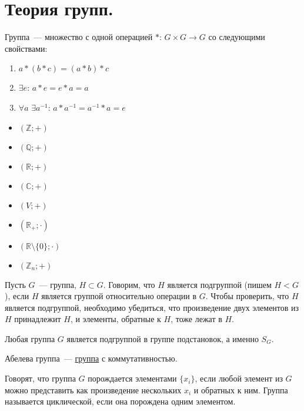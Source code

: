 \documentclass{article}
\begin{document}
	\tableofcontents
	\setcounter{tocdepth}{3}
	\newpage
	\section{Теория групп.}
	\begin{definition}
		\label{group-def}
		Группа~--- множество с одной операцией $*$: $G \times G \rightarrow G$ со следующими свойствами:
		\begin{enumerate}
			\item $a * (b * c) = (a * b) * c$
			\item $\exists e$: $a * e = e * a = a$
			\item $\forall a$ $\exists a^{-1}$: $a * a^{-1} = a^{-1} * a = e$
		\end{enumerate}
	\end{definition}
	\begin{example}
		\begin{itemize}
			\item $(\mathbb{Z}; +)$
			\item $(\mathbb{Q}; +)$
			\item $(\mathbb{R}; +)$
			\item $(\mathbb{C}; +)$
			\item $(V; +)$
			\item $(\mathbb{R}_+; \cdot)$
			\item $(\mathbb{R} \setminus \{ 0 \}; \cdot)$
			\item $(\mathbb{Z}_n; +)$
		\end{itemize}
	\end{example}
	\begin{definition}
		Пусть $G$~--- группа, $H \subset G$. Говорим, что $H$ является подгруппой (пишем $H < G$), если $H$ является группой относительно операции в $G$. Чтобы проверить, что $H$ является подгруппой, необходимо убедиться, что произведение двух элементов из $H$ принадлежит $H$, и элементы, обратные к $H$, тоже лежат в $H$.
	\end{definition}
	\begin{theorem}[Кэли]
		Любая группа $G$ является подгруппой в группе подстановок, а именно $S_G$.
	\end{theorem}
	\begin{definition}
		Абелева группа~--- \hyperref[group-def]{группа} с коммутативностью.
	\end{definition}
	\begin{definition}
		Говорят, что группа $G$ порождается элементами $\{ x_i \}$, если любой элемент из $G$ можно представить как произведение нескольких $x_i$ и обратных к ним. Группа называется циклической, если она порождена одним элементом.
	\end{definition}
\end{document}
